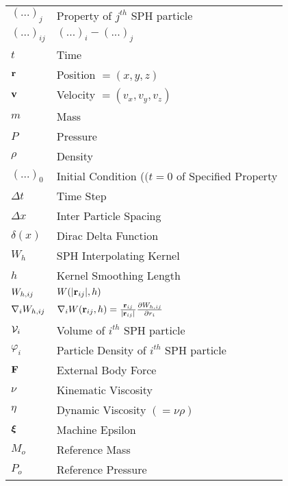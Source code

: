 \begin{longtable}{ll}
$(...)_{j}$             & Property of $j^{th}$ SPH particle \\
$(...)_{ij}$            & $(...)_{i} - (...)_{j}$           \\
$t$                     & Time                              \\
$\vect{r}$              & Position $=(x, y, z)$             \\
$\vect{v}$              & Velocity $=(v_x, v_y, v_z)$       \\
$m$                     & Mass                              \\
$P$                     & Pressure                          \\
$\rho$                  & Density                           \\
$(...)_0$                      & Initial Condition ($(t=0$ of Specified Property                                             \\
$\Delta t$              & Time Step                         \\
$\Delta x$              & Inter Particle Spacing            \\
$\delta (x)$            & Dirac Delta Function              \\
$W_{h}$                 & SPH Interpolating Kernel          \\
$h$                     & Kernel Smoothing Length           \\
$\WIJ$                  & $W(|\RIJ|, h)$                    \\
$\DWIJ$                        & $\nabla_i W(\RIJ,h) = \frac{\RIJ}{\RtwoIJ[]} \PartialDerivative[r_i]{\WIJ}$                 \\
$\Vol_i$                & Volume of $i^{th}$ SPH particle   \\
$\varphi_i$                    & Particle Density of $i^{th}$ SPH particle                                                   \\
$\vect{F}$              & External Body Force               \\
$\nu$                   & Kinematic Viscosity               \\
$\eta$                  & Dynamic Viscosity $(=\nu \rho)$   \\
$\MachineEpsilon$       & Machine Epsilon                   \\
$M_o$                   & Reference Mass                    \\
$P_o$                   & Reference Pressure                \\

\end{longtable}
